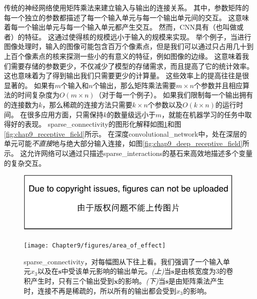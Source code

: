 传统的神经网络使用矩阵乘法来建立输入与输出的连接关系。
其中，参数矩阵的每一个独立的参数都描述了每一个输入单元与每一个输出单元间的交互。
这意味着每一个输出单元与每一个输入单元都产生交互。
然而，\gls{CNN}具有（也叫做或者）的特征。
这通过使得核的规模远小于输入的规模来实现。
举个例子，当进行图像处理时，输入的图像可能包含百万个像素点，但是我们可以通过只占用几十到上百个像素点的核来探测一些小的有意义的特征，例如图像的边缘。
这意味着我们需要存储的参数更少，不仅减少了模型的存储需求，而且提高了它的统计效率。
这也意味着为了得到输出我们只需要更少的计算量。
这些效率上的提高往往是很显著的。
如果有$m$个输入和$n$个输出，那么矩阵乘法需要$m \times n$个参数并且相应算法的时间复杂度为$O(m\times n)$（对于每一个例子）。
如果我们限制每一个输出拥有的连接数为$k$，那么稀疏的连接方法只需要$k\times n$个参数以及$O(k\times n)$的运行时间。
在很多应用方面，只需保持$k$的数量级远小于$m$，就能在机器学习的任务中取得好的表现。
\gls{sparse_connectivity}的图形化解释如图\ref{fig:chap9_area_of_effect}和图\ref{fig:chap9_receptive_field}所示。
在深度\gls{convolutional_network}中，处在深层的单元可能\emph{不直接}地与绝大部分输入连接，如图\ref{fig:chap9_deep_receptive_field}所示。
这允许网络可以通过只描述\gls{sparse_interactions}的基石来高效地描述多个变量的复杂交互。
\begin{figure}[!htb]
\ifOpenSource
\centerline{\includegraphics{figure.pdf}}
\else
\centerline{\texttt{[image: Chapter9/figures/area\_of\_effect]}}
\fi
\captionsetup{singlelinecheck=off}
\caption[Caption for LOF]{\gls{sparse_connectivity}，对每幅图从下往上看。我们强调了一个输入单元$x_3$以及在$\bm{s}$中受该单元影响的输出单元。\emph{(上)}当$\bm{s}$是由核宽度为3的卷积产生时，只有三个输出受到$\bm{x}$的影响\protect\footnotemark。\emph{(下)}当$\bm{s}$是由矩阵乘法产生时，连接不再是稀疏的，所以所有的输出都会受到$x_3$的影响。}
\label{fig:chap9_area_of_effect}
\end{figure}
